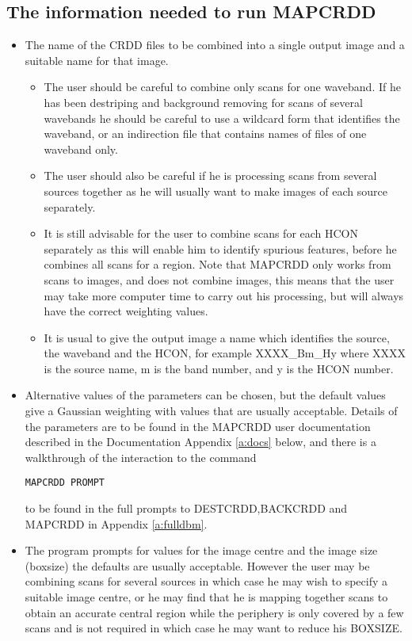 \documentclass[twoside,11pt]{article}
\begin{document}
\subsection{The information needed to run MAPCRDD}
\begin{itemize}
\item The name of the CRDD files to be combined into a single output image and
a suitable name for that image. 
\begin{itemize}
\item The user should be careful to combine only scans for one waveband. If he 
has been destriping and background removing for scans of several wavebands he 
should be careful to use a wildcard form that identifies the waveband, or an 
indirection file that contains names of files of one waveband only.
\item The user should also be careful if he is processing scans from several
sources together as he will usually want to make images of each source 
separately.
\item It is still advisable for the user to combine scans for each HCON 
separately as this will enable him to identify spurious features, before he 
combines all scans for a region. Note that MAPCRDD only works from scans to 
images, and does not combine images, this means that the user may take more
computer time to carry out his processing, but will always have the correct
weighting values.
\item It is usual to give the output image a name which identifies the source,
the waveband and the HCON, for example XXXX\_Bm\_Hy where XXXX is the source 
name, m is the band number, and y is the HCON number.
\end{itemize}
\item Alternative values of the parameters can be chosen, but the default values
give a Gaussian weighting with values that are usually acceptable. Details of
the parameters are to be found in the MAPCRDD user documentation described in
the Documentation Appendix \ref{a:docs} below, and there is a walkthrough of
the interaction to the command
\begin{small}
\begin{verbatim}
MAPCRDD PROMPT
\end{verbatim}
\end{small}
to be found in the full prompts to DESTCRDD,BACKCRDD and MAPCRDD in Appendix
\ref {a:fulldbm}.
\item The program prompts for  values for the image  centre and the image size
(boxsize) the defaults are usually acceptable. However the user may be
combining scans for several sources in which case he may wish to specify a
suitable image centre, or he may find that he is mapping together scans to
obtain an accurate central region while the periphery is only covered by a few
scans and is not required in which case he may want to reduce his BOXSIZE.
\end{itemize}
\end{document}
